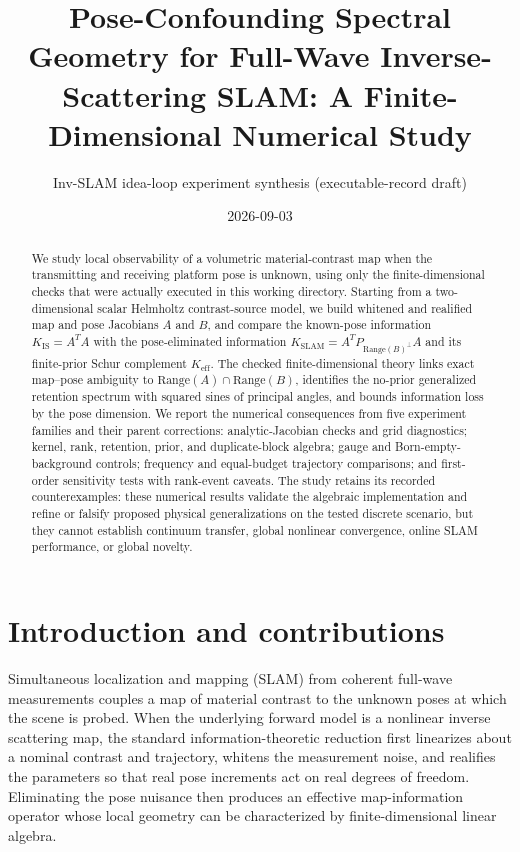 \documentclass[12pt]{article}
\title{Pose-Confounding Spectral Geometry for Full-Wave Inverse-Scattering SLAM:
A Finite-Dimensional Numerical Study}
\author{Inv-SLAM idea-loop experiment synthesis (executable-record draft)}
\date{2026-09-03}
\begin{document}
\maketitle

\begin{abstract}
We study local observability of a volumetric material-contrast map when the
transmitting and receiving platform pose is unknown, using only the
finite-dimensional checks that were actually executed in this working
directory. Starting from a two-dimensional scalar Helmholtz contrast-source
model, we build whitened and realified map and pose Jacobians $A$ and $B$, and
compare the known-pose information $K_{\mathrm{IS}}=A^TA$ with the
pose-eliminated information
$K_{\mathrm{SLAM}}=A^T P_{\mathrm{Range}(B)^\perp}A$ and its finite-prior
Schur complement $K_{\mathrm{eff}}$. The checked finite-dimensional theory
links exact map--pose ambiguity to $\mathrm{Range}(A)\cap\mathrm{Range}(B)$,
identifies the no-prior generalized retention spectrum with squared sines of
principal angles, and bounds information loss by the pose dimension. We report
the numerical consequences from five experiment families and their parent
corrections: analytic-Jacobian checks and grid diagnostics; kernel, rank,
retention, prior, and duplicate-block algebra; gauge and Born-empty-background
controls; frequency and equal-budget trajectory comparisons; and first-order
sensitivity tests with rank-event caveats. The study retains its recorded
counterexamples: these numerical results validate the algebraic implementation
and refine or falsify proposed physical generalizations on the tested discrete
scenario, but they cannot establish continuum transfer, global nonlinear
convergence, online SLAM performance, or global novelty.
\end{abstract}

\tableofcontents

\section{Introduction and contributions}\label{sec:intro}

Simultaneous localization and mapping (SLAM) from coherent full-wave
measurements couples a map of material contrast to the unknown poses at which
the scene is probed. When the underlying forward model is a nonlinear inverse
scattering map, the standard information-theoretic reduction first linearizes
about a nominal contrast and trajectory, whitens the measurement noise, and
realifies the parameters so that real pose increments act on real degrees of
freedom. Eliminating the pose nuisance then produces an effective
map-information operator whose local geometry can be characterized by
finite-dimensional linear algebra.
\end{document}
